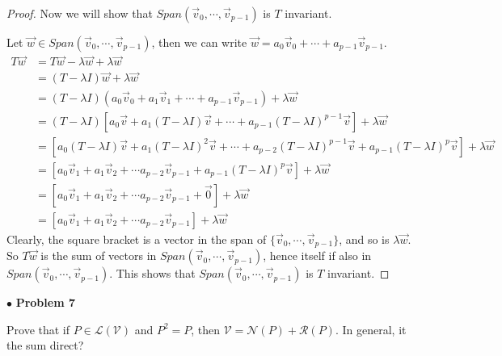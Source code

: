 \documentclass{article}
\begin{document}
\begin{proof}
Now we will show that $Span(\vec{v}_0, \cdots, \vec{v}_{p-1})$ is $T$ invariant.

Let $\vec{w} \in Span(\vec{v}_0, \cdots, \vec{v}_{p-1})$, then we can write $\vec{w} = a_0\vec{v}_0 + \cdots + a_{p-1}\vec{v}_{p-1}$.
\begin{align*}
T\vec{w} &= T\vec{w} -\lambda \vec{w} + \lambda\vec{w} \\
&= (T-\lambda I) \vec{w} +\lambda \vec{w} \\
&= (T- \lambda I)(a_0\vec{v}_0 + a_1 \vec{v}_1+ \cdots +a_{p-1}\vec{v}_{p-1}) + \lambda \vec{w} \\
&= (T-\lambda I)[a_0 \vec{v} + a_1(T-\lambda I)\vec{v} + \cdots + a_{p-1}(T-\lambda I)^{p-1}\vec{v}] +\lambda \vec{w} \\
&= [a_0 (T-\lambda I)\vec{v} + a_1(T-\lambda I)^2\vec{v} + \cdots+ a_{p-2}(T-\lambda I)^{p-1} \vec{v} + a_{p-1}(T-\lambda I)^{p}\vec{v}] + \lambda \vec{w} \\
&= [a_0\vec{v}_1 + a_1 \vec{v}_2+ \cdots a_{p-2}\vec{v}_{p-1} + a_{p-1}(T-\lambda I)^p\vec{v}] + \lambda \vec{w} \\
&=  [a_0\vec{v}_1 + a_1 \vec{v}_2+ \cdots a_{p-2}\vec{v}_{p-1} + \vec{0}] + \lambda \vec{w} \\
&=  [a_0\vec{v}_1 + a_1 \vec{v}_2+ \cdots a_{p-2}\vec{v}_{p-1} ] + \lambda \vec{w}
\end{align*} 
Clearly, the square bracket is a vector in the span of $\{ \vec{v}_0, \cdots, \vec{v}_{p-1} \}$, and so is $\lambda \vec{w}$. So $T\vec{w}$ is the sum of vectors in $Span(\vec{v}_0, \cdots, \vec{v}_{p-1})$, hence itself if also in $Span(\vec{v}_0, \cdots, \vec{v}_{p-1})$. This shows that $Span(\vec{v}_0, \cdots, \vec{v}_{p-1})$ is $T$ invariant.
\end{proof}

\newpage
$ \bullet$ \textbf{Problem 7}
\medskip

\begin{itshape}
Prove that if $P \in \mathcal{L}(\mathcal{V})$ and $P^2=P$, then $\mathcal{V} = \mathcal{N}(P) + \mathcal{R}(P)$. In general, it the sum direct?
\end{itshape}
\medskip
\end{document}
